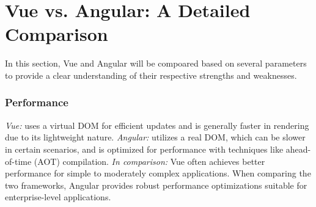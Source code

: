 



\section{Vue vs. Angular: A Detailed Comparison}

In this section, Vue and Angular will be compoared based on several parameters to provide a clear understanding of their respective strengths and weaknesses.

\subsubsection{Performance}

\textit{Vue:} uses a virtual DOM for efficient updates and is generally faster in rendering due to its lightweight nature.
\newline\textit{Angular:} utilizes a real DOM, which can be slower in certain scenarios, and is optimized for performance with techniques like ahead-of-time (AOT) compilation.
\newline\textit{In comparison:} Vue often achieves better performance for simple to moderately complex applications. When comparing the two frameworks, Angular provides robust performance optimizations suitable for enterprise-level applications.

